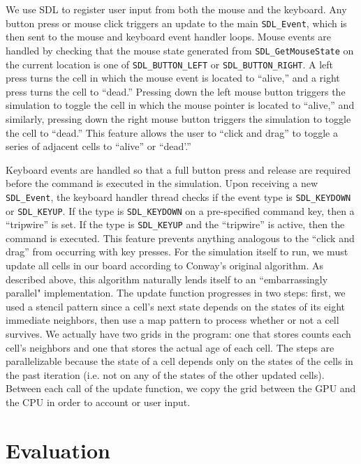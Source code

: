 \documentclass[onecolumn,12pt]{IEEEtran}
\begin{document}
  We use SDL to register user input from both the mouse and the keyboard. Any
  button press or mouse click triggers an update to the main \texttt{SDL\_Event},
  which is then sent to the mouse and keyboard event handler loops. Mouse events
  are handled by checking that the mouse state generated from
  \texttt{SDL\_GetMouseState} on the current location is one of
  \texttt{SDL\_BUTTON\_LEFT} or \texttt{SDL\_BUTTON\_RIGHT}. A left press turns
  the cell in which the mouse event is located to ``alive,'' and a right press
  turns the cell to ``dead.'' Pressing down the left mouse button triggers the
  simulation to toggle the cell in which the mouse pointer is located to
  ``alive,'' and similarly, pressing down the right mouse button triggers the
  simulation to toggle the cell to ``dead.'' This feature allows the user to
  ``click and drag'' to toggle a series of adjacent cells to ``alive'' or
  ``dead'.''

  Keyboard events are handled so that a full button press and release are
  required before the command is executed in the simulation. Upon receiving a new
  \texttt{SDL\_Event}, the keyboard handler thread checks if the event type is
  \texttt{SDL\_KEYDOWN} or \texttt{SDL\_KEYUP}. If the type is
  \texttt{SDL\_KEYDOWN} on a pre-specified command key, then a ``tripwire'' is
  set. If the type is \texttt{SDL\_KEYUP} and the ``tripwire'' is active, then
  the command is executed. This feature prevents anything analogous to the
  ``click and drag'' from occurring with key presses.  For the simulation itself to run, we must update all cells in our board
  according to Conway's original algorithm. As described above, this algorithm
  naturally lends itself to an ``embarrassingly parallel" implementation. The
  update function progresses in two steps: first, we used a stencil pattern since
  a cell's next state depends on the states of its eight immediate neighbors,
  then use a map pattern to process whether or not a cell survives. We actually
  have two grids in the program: one that stores counts each cell's neighbors and
  one that stores the actual age of each cell. The steps are parallelizable
  because the state of a cell depends only on the states of the cells in the past
  iteration (i.e. not on any of the states of the other updated cells). Between
  each call of the update function, we copy the grid between the GPU and the CPU
  in order to account or user input.

  \section{Evaluation}
\end{document}

